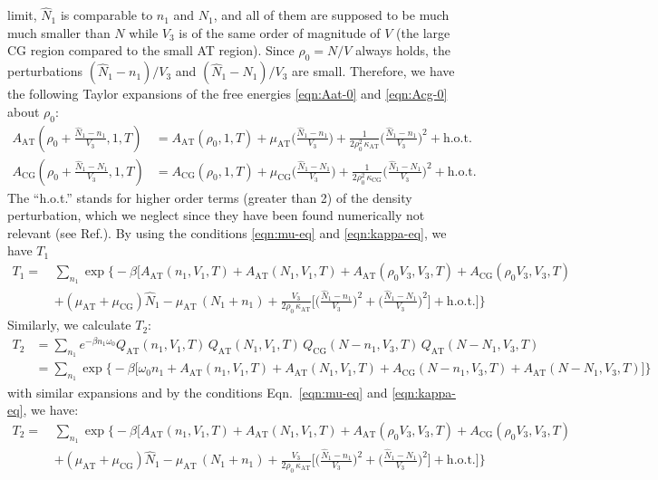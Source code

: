 \documentclass[aip,jcp,a4paper,reprint,onecolumn]{revtex4-1}
\newcommand{\AT}{{\textrm{{AT}}}}
\newcommand{\CG}{{\textrm{CG}}}
\begin{document}
limit, $\hat N_1$ is comparable to $n_1$ and $N_1$, and all of them are
supposed to be much much smaller than $N$ while $V_3$ is of the same order of magnitude of $V$ (the large CG region compared to the small AT region).
Since $\rho_0 = N/V$ always holds, the perturbations
$(\hat N_1 - n_1)/{V_3}$
and $(\hat N_1 - N_1)/{V_3}$ are small.
Therefore, we have the following
Taylor expansions of the free energies \eqref{eqn:Aat-0} and \eqref{eqn:Acg-0}
about $\rho_0$:
\begin{align}
  A_{\AT}(\rho_0 + \frac{\hat N_1 - n_1}{V_3},1,T)
  &= A_{\AT}(\rho_0,1,T)
  +\mu_{\AT}
  \Big(
  \frac{\hat N_1 - n_1}{V_3}
  \Big)
  +
  \frac1{2\rho_0^2\,\kappa_{\AT}}
  \Big(
  \frac{\hat N_1 - n_1}{V_3}
  \Big)^2
  + \textrm{h.o.t.} \\
  A_{\CG}(\rho_0 + \frac{\hat N_1 - N_1}{V_3},1,T)
  &= A_{\CG}(\rho_0,1,T)
  +\mu_{\CG}
  \Big(
  \frac{\hat N_1 - N_1}{V_3}
  \Big)
  +
  \frac1{2\rho_0^2\,\kappa_{\CG}}
  \Big(
  \frac{\hat N_1 - N_1}{V_3}
  \Big)^2
  + \textrm{h.o.t.} 
\end{align}
The ``h.o.t.'' stands for higher order terms (greater than 2)
of the density perturbation, which we neglect since they have been found numerically not relevant (see Ref.\cite{rdfcorr}).
By using the conditions \eqref{eqn:mu-eq} and \eqref{eqn:kappa-eq},
we have $T_1$
\begin{align}\nonumber
  T_1
  = \,&
  \sum_{n_1}
  \exp
  \Big\{-\beta
  \Big[
  A_{\AT}(n_1,V_1,T) +
  A_{\AT}(N_1,V_1,T) +
  A_{\AT}(\rho_0V_3,V_3,T) +
  A_{\CG}(\rho_0V_3,V_3,T) \\
  \,&+(\mu_\AT + \mu_\CG)\hat N_1
  -\mu_{\AT}\,(N_1 + n_1) +
  \frac{V_3}{2\rho_0\, \kappa_{\AT}}
  \Big[
  \Big(
  \frac{\hat N_1 - n_1}{V_3}
  \Big)^2
  +
  \Big(
  \frac{\hat N_1 - N_1}{V_3}
  \Big)^2
  \Big]
  +\textrm{h.o.t.}
  \Big]
  \Big\}
\end{align}
Similarly, we calculate $T_2$:
\begin{align}\nonumber
  T_2
  &=
  \sum_{n_1}
  e^{-\beta n_1\omega_0}
  Q_{\AT}(n_1,V_1,T)\,
  Q_{\AT}(N_1,V_1,T)\,
  Q_{\CG}(N-n_1,V_3,T)\,
  Q_{\AT}(N-N_1,V_3,T) \\\nonumber
  &=
  \sum_{n_1}
  \exp
  \big\{-\beta
  \big[
  \omega_0n_1 +
  A_{\AT}(n_1,V_1,T) +
  A_{\AT}(N_1,V_1,T) +
  A_{\CG}(N-n_1,V_3,T) +
  A_{\AT}(N-N_1,V_3,T)
  \big]
  \big\}
\end{align}
with similar expansions and by the conditions Eqn.~\eqref{eqn:mu-eq}
and \eqref{eqn:kappa-eq}, we have:
\begin{align}\nonumber
  T_2
  = \,&
  \sum_{n_1}
  \exp
  \Big\{-\beta
  \Big[
  A_{\AT}(n_1,V_1,T) +
  A_{\AT}(N_1,V_1,T) +
  A_{\AT}(\rho_0V_3,V_3,T) +
  A_{\CG}(\rho_0V_3,V_3,T) \\
  \,&+(\mu_\AT + \mu_\CG)\hat N_1
  -\mu_{\AT}\,(N_1 + n_1) +
  \frac{V_3}{2\rho_0\, \kappa_{\AT}}
  \Big[
  \Big(
  \frac{\hat N_1 - n_1}{V_3}
  \Big)^2
  +
  \Big(
  \frac{\hat N_1 - N_1}{V_3}
  \Big)^2
  \Big]
  +\textrm{h.o.t.}
  \Big]
  \Big\}
\end{align}
\end{document}
